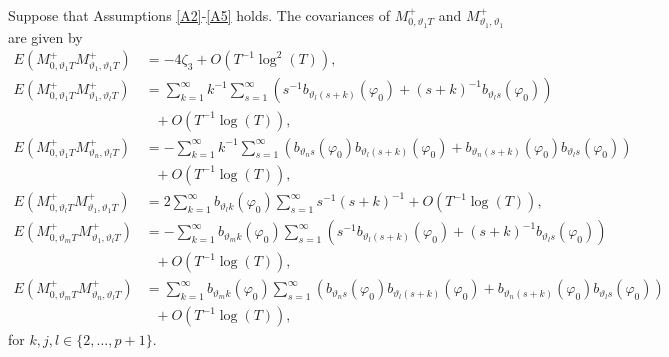 {{\begin{lemma} \label{genlemma891}
    Suppose that Assumptions \ref{A2}-\ref{A5} holds. The covariances of  $M^+_{0,\vartheta_1  T}$ and $M^+_{\vartheta_1 ,\vartheta_1}$ are given by 
\begin{align}
    E\left(  M^+_{0,\vartheta_1  T}  M^+_{\vartheta_1 ,\vartheta_1   T} \right) &= -4\zeta_3 + O(T^{-1} \log^2(T)), \label{ab11} \\
    E\left(  M^+_{0,\vartheta_1  T}  M^+_{\vartheta_1 ,\vartheta_l   T} \right) &= \sum_{k = 1}^{\infty} k^{-1} \sum_{s = 1}^{\infty} \left(  s^{-1} b_{\vartheta_l (s+k)}(\varphi_0) + (s+k)^{-1} b_{\vartheta_l s}(\varphi_0) \right) \nonumber \\
    &\ \ \ + O(T^{-1}\log(T)), \label{ab21}\\ 
    E\left(  M^+_{0,\vartheta_1  T}  M^+_{\vartheta_n ,\vartheta_l   T} \right) &= -\sum_{k = 1}^{\infty} k^{-1} \sum_{s = 1}^{\infty} \left(  b_{\vartheta_n s}(\varphi_0) b_{\vartheta_l (s+k)}(\varphi_0) + b_{\vartheta_n (s+k)}(\varphi_0) b_{\vartheta_l s}(\varphi_0) \right) \nonumber \\  
    &\ \ \ + O(T^{-1}\log(T)), \label{ab31}\\
    E\left(  M^+_{0,\vartheta_l  T}  M^+_{\vartheta_1 ,\vartheta_1   T} \right) &= 2 \sum^{\infty}_{k = 1} b_{\vartheta_l k}(\varphi_0) \sum_{s = 1}^{\infty} s^{-1} (s+k)^{-1} + O(T^{-1}\log(T)),\label{ab41}\\
    E\left(  M^+_{0,\vartheta_m  T}  M^+_{\vartheta_1 ,\vartheta_l   T} \right) &= -\sum_{k = 1}^{\infty} b_{\vartheta_m k}(\varphi_0)  \sum_{s = 1}^{\infty} \left(  s^{-1} b_{\vartheta_l (s+k)}(\varphi_0) + (s+k)^{-1} b_{\vartheta_l s}(\varphi_0) \right) \nonumber \\ 
    &\ \ \ + O(T^{-1}\log(T)),\label{ab51}\\ 
    E\left(  M^+_{0,\vartheta_m  T}  M^+_{\vartheta_n ,\vartheta_l   T} \right) &= \sum_{k = 1}^{\infty} b_{\vartheta_m k}(\varphi_0)  \sum_{s = 1}^{\infty} \left(  b_{\vartheta_n s}(\varphi_0) b_{\vartheta_l (s+k)}(\varphi_0) + b_{\vartheta_n (s+k)}(\varphi_0) b_{\vartheta_l s}(\varphi_0) \right) \nonumber \\
    &\ \ \ + O(T^{-1}\log(T)), \label{ab61}
\end{align}
for $k,j,l \in \{2,\ldots,p+1 \}$.

\end{lemma}

}}
